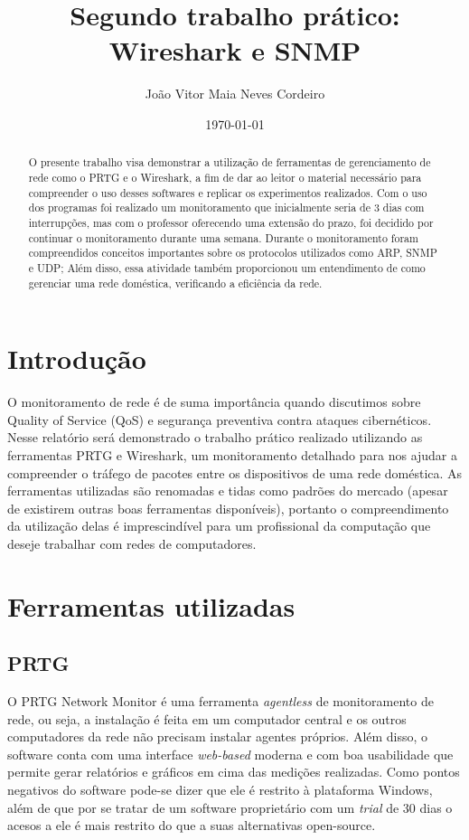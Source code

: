 \documentclass[12pt]{article}
\author{João Vitor Maia Neves Cordeiro}
\title{Segundo trabalho prático: Wireshark e SNMP}
\date{\today}
\begin{document}
\maketitle

\begin{abstract}
O presente trabalho visa demonstrar a utilização de ferramentas de gerenciamento de rede como o PRTG e o Wireshark, a fim de dar ao leitor o material necessário para compreender o uso desses softwares e replicar os experimentos realizados. Com o uso dos programas foi realizado um monitoramento que inicialmente seria de 3 dias com interrupções, mas com o professor oferecendo uma extensão do prazo, foi decidido por continuar o monitoramento durante uma semana. Durante o monitoramento foram compreendidos conceitos importantes sobre os protocolos utilizados como ARP, SNMP e UDP; Além disso, essa atividade também proporcionou um entendimento de como gerenciar uma rede doméstica, verificando a eficiência da rede.
\end{abstract}

\tableofcontents

\section{Introdução}

O monitoramento de rede é de suma importância quando discutimos sobre Quality of Service (QoS) e segurança preventiva contra ataques cibernéticos. Nesse relatório será demonstrado o trabalho prático realizado utilizando as ferramentas PRTG e Wireshark, um monitoramento detalhado para nos ajudar a compreender o tráfego de pacotes entre os dispositivos de uma rede doméstica. As ferramentas utilizadas são renomadas e tidas como padrões do mercado (apesar de existirem outras boas ferramentas disponíveis), portanto o compreendimento da utilização delas é imprescindível para um profissional da computação que deseje trabalhar com redes de computadores.

\section{Ferramentas utilizadas}

\subsection{PRTG}

O PRTG Network Monitor é uma ferramenta \emph{agentless} de monitoramento de rede, ou seja, a instalação é feita em um computador central e os outros computadores da rede não precisam instalar agentes próprios. Além disso, o software conta com uma interface \emph{web-based} moderna e com boa usabilidade que permite gerar relatórios e gráficos em cima das medições realizadas. Como pontos negativos do software pode-se dizer que ele é restrito à plataforma Windows, além de que por se tratar de um software proprietário com um \emph{trial} de 30 dias o acesos a ele é mais restrito do que a suas alternativas open-source.
\end{document}

